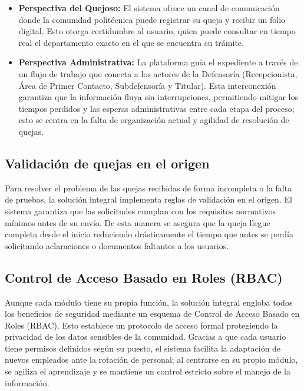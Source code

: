 \begin{flushleft}
\begin{itemize}
    \item \textbf{Perspectiva del Quejoso:} El sistema ofrece un canal de comunicación donde la comunidad politécnica puede registrar su queja y recibir un folio digital. Esto otorga certidumbre al usuario, quien puede consultar en tiempo real el departamento exacto en el que se encuentra su trámite.
    \item \textbf{Perspectiva Administrativa:} La plataforma guía el expediente a través de un flujo de trabajo que conecta a los actores de la Defensoría (Recepcionista, Área de Primer Contacto, Subdefensoría y Titular). Esta interconexión garantiza que la información fluya sin interrupciones, permitiendo mitigar los tiempos perdidos y las esperas administrativas entre cada etapa del proceso; esto se centra en la falta de organización actual y agilidad de resolución de quejas.
\end{itemize}

\subsection{Validación de quejas en el origen}

Para resolver el problema de las quejas recibidas de forma incompleta o la falta de pruebas, la solución integral implementa reglas de validación en el origen. El sistema garantiza que las solicitudes cumplan con los requisitos normativos mínimos antes de su envío. De esta manera se asegura que la queja llegue completa desde el inicio reduciendo drásticamente el tiempo que antes se perdía solicitando aclaraciones o documentos faltantes a los usuarios.

\subsection{Control de Acceso Basado en Roles (RBAC)}

Aunque cada módulo tiene su propia función, la solución integral engloba todos los beneficios de seguridad mediante un esquema de Control de Acceso Basado en Roles (RBAC). Esto establece un protocolo de acceso formal protegiendo la privacidad de los datos sensibles de la comunidad. Gracias a que cada usuario tiene permisos definidos según su puesto, el sistema facilita la adaptación de nuevos empleados ante la rotación de personal; al centrarse en su propio módulo, se agiliza el aprendizaje y se mantiene un control estricto sobre el manejo de la información.


\end{flushleft}
